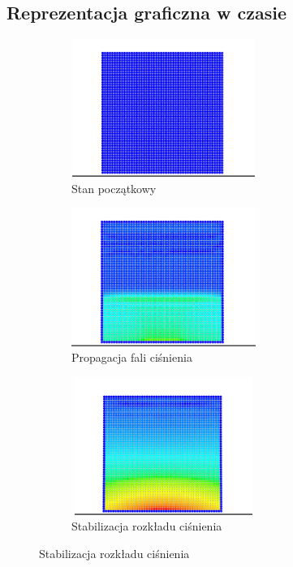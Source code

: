 \documentclass[12pt, letterpaper]{report}
\begin{document}
    \subsection{Reprezentacja graficzna w czasie}

    \begin{figure}[h]

        \begin{subfigure}{0.5\textwidth}
            \centering
            \includegraphics[width=6cm, height=4.5cm]{pressure_01.png} 
            \caption{Stan początkowy}
        \end{subfigure}
        \begin{subfigure}{0.5\textwidth}
            \centering
            \includegraphics[width=6cm, height=4.5cm]{pressure_02.png}
            \caption{Propagacja fali ciśnienia}
        \end{subfigure}
        \begin{subfigure}{0.5\textwidth}
            \centering
            \includegraphics[width=6cm, height=4.5cm]{pressure_03.png}
            \caption{Stabilizacja rozkładu ciśnienia}
        \end{subfigure}

\end{figure}
\end{document}
